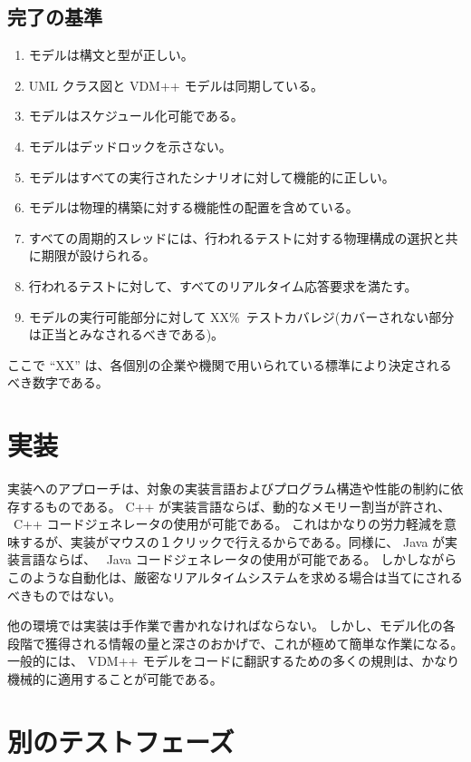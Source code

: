 \documentclass[\pformat,12pt]{jreport}
\begin{document}
\subsection{完了の基準}

\begin{enumerate}
\item モデルは構文と型が正しい。
\item UML クラス図と VDM++ モデルは同期している。
\item モデルはスケジュール化可能である。
\item モデルはデッドロックを示さない。
\item モデルはすべての実行されたシナリオに対して機能的に正しい。
\item モデルは物理的構築に対する機能性の配置を含めている。
\item すべての周期的スレッドには、行われるテストに対する物理構成の選択と共に期限が設けられる。
\item 行われるテストに対して、すべてのリアルタイム応答要求を満たす。
\item モデルの実行可能部分に対して XX\%\ テストカバレジ(カバーされない部分は正当とみなされるべきである)。
\end{enumerate}

ここで ``XX'' は、各個別の企業や機関で用いられている標準により決定されるべき数字である。

\section{実装}

実装へのアプローチは、対象の実装言語およびプログラム構造や性能の制約に依存するものである。
C++ が実装言語ならば、動的なメモリー割当が許され、 \VDMTools\ C++ コードジェネレータの使用が可能である。
これはかなりの労力軽減を意味するが、実装がマウスの１クリックで行えるからである。同様に、 Java が実装言語ならば、 \VDMTools\ Java コードジェネレータの使用が可能である。
しかしながらこのような自動化は、厳密なリアルタイムシステムを求める場合は当てにされるべきものではない。

他の環境では実装は手作業で書かれなければならない。
しかし、モデル化の各段階で獲得される情報の量と深さのおかげで、これが極めて簡単な作業になる。
一般的には、 VDM++ モデルをコードに翻訳するための多くの規則は、かなり機械的に適用することが可能である。

\section{別のテストフェーズ}\label{sec:tests}
\end{document}
